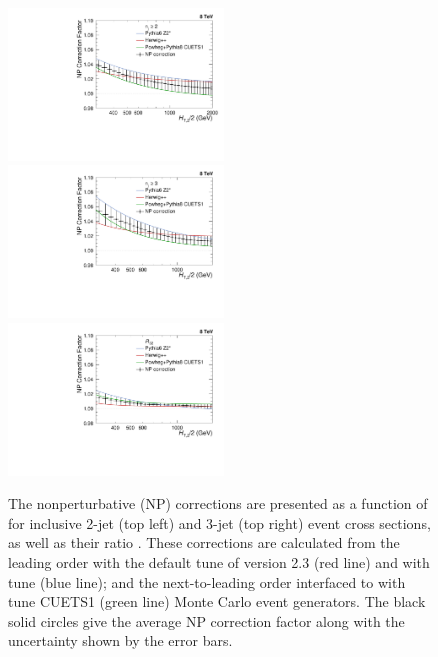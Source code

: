 \begin{figure}[!ht]
 \begin{center}
 \hspace*{-5mm}\includegraphics[width=0.51\textwidth]{Plots_HT_2_150/Final_NP_Corr_2.pdf}%
 ~~\includegraphics[width=0.51\textwidth]{Plots_HT_2_150/Final_NP_Corr_3.pdf}\\
 \includegraphics[width=0.51\textwidth]{Plots_HT_2_150/Final_NP_Corr_Ratio_32.pdf}
 \caption{The nonperturbative (NP) corrections are presented as a function of \httwo for inclusive 2-jet (top left) and 3-jet (top right) event cross sections, as well as their ratio \ratio. These corrections are calculated from the leading order \HERWIGPP with the default tune of version 2.3 (red line) and \PYTHIAS with tune \Ztwostar (blue line); and the next-to-leading order \POWHEG interfaced to \PYTHIAE with tune CUETS1 (green line) Monte Carlo event generators. The black solid circles give the average NP correction factor along with the uncertainty shown by the error bars. }
 \label{fig:np_factors}
 \end{center}
\end{figure}


